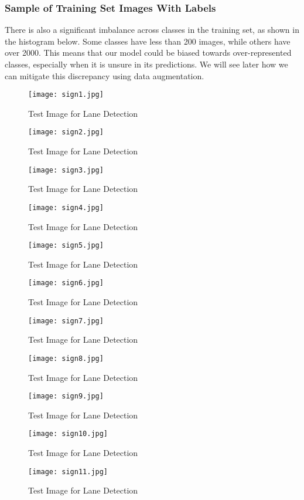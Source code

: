 \subsubsection{Sample of Training Set Images With Labels}
There is also a significant imbalance across classes in the training set, as shown in the histogram below. Some classes have less than 200 images, while others have over 2000. This means that our model could be biased towards over-represented classes, especially when it is unsure in its predictions. We will see later how we can mitigate this discrepancy using data augmentation.
\begin{figure}[H]
	\centering
	\texttt{[image: sign1.jpg]}
	\caption{Test Image for Lane Detection}
\end{figure}
\begin{figure}[H]
	\centering
	\texttt{[image: sign2.jpg]}
	\caption{Test Image for Lane Detection}
\end{figure}
\begin{figure}[H]
	\centering
	\texttt{[image: sign3.jpg]}
	\caption{Test Image for Lane Detection}
\end{figure}
\begin{figure}[H]
	\centering
	\texttt{[image: sign4.jpg]}
	\caption{Test Image for Lane Detection}
\end{figure}
\begin{figure}[H]
	\centering
	\texttt{[image: sign5.jpg]}
	\caption{Test Image for Lane Detection}
\end{figure}
\begin{figure}[H]
	\centering
	\texttt{[image: sign6.jpg]}
	\caption{Test Image for Lane Detection}
\end{figure}
\begin{figure}[H]
	\centering
	\texttt{[image: sign7.jpg]}
	\caption{Test Image for Lane Detection}
\end{figure}
\begin{figure}[H]
	\centering
	\texttt{[image: sign8.jpg]}
	\caption{Test Image for Lane Detection}
\end{figure}
\begin{figure}[H]
	\centering
	\texttt{[image: sign9.jpg]}
	\caption{Test Image for Lane Detection}
\end{figure}
\begin{figure}[H]
	\centering
	\texttt{[image: sign10.jpg]}
	\caption{Test Image for Lane Detection}
\end{figure}
\begin{figure}[H]
	\centering
	\texttt{[image: sign11.jpg]}
	\caption{Test Image for Lane Detection}
\end{figure}

